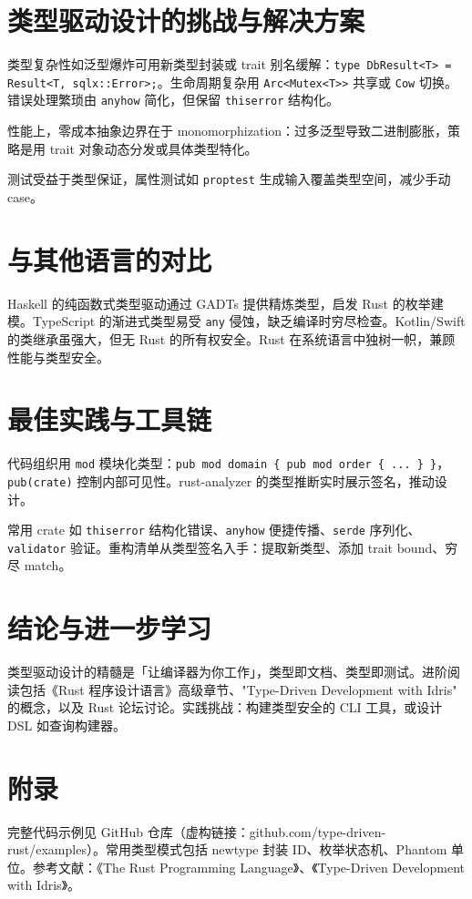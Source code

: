 \chapter{类型驱动设计的挑战与解决方案}
类型复杂性如泛型爆炸可用新类型封装或 trait 别名缓解：\texttt{type DbResult<T> = Result<T, sqlx::Error>;}。生命周期复杂用 \texttt{Arc<Mutex<T>>} 共享或 \texttt{Cow} 切换。错误处理繁琐由 \texttt{anyhow} 简化，但保留 \texttt{thiserror} 结构化。\par
性能上，零成本抽象边界在于 monomorphization：过多泛型导致二进制膨胀，策略是用 trait 对象动态分发或具体类型特化。\par
测试受益于类型保证，属性测试如 \texttt{proptest} 生成输入覆盖类型空间，减少手动 case。\par
\chapter{与其他语言的对比}
Haskell 的纯函数式类型驱动通过 GADTs 提供精炼类型，启发 Rust 的枚举建模。TypeScript 的渐进式类型易受 \texttt{any} 侵蚀，缺乏编译时穷尽检查。Kotlin/Swift 的类继承虽强大，但无 Rust 的所有权安全。Rust 在系统语言中独树一帜，兼顾性能与类型安全。\par
\chapter{最佳实践与工具链}
代码组织用 \texttt{mod} 模块化类型：\texttt{pub mod domain \{{} pub mod order \{{} ... \}{} \}{}}，\texttt{pub(crate)} 控制内部可见性。rust-analyzer 的类型推断实时展示签名，推动设计。\par
常用 crate 如 \texttt{thiserror} 结构化错误、\texttt{anyhow} 便捷传播、\texttt{serde} 序列化、\texttt{validator} 验证。重构清单从类型签名入手：提取新类型、添加 trait bound、穷尽 match。\par
\chapter{结论与进一步学习}
类型驱动设计的精髓是「让编译器为你工作」，类型即文档、类型即测试。进阶阅读包括《Rust 程序设计语言》高级章节、"Type-Driven Development with Idris" 的概念，以及 Rust 论坛讨论。实践挑战：构建类型安全的 CLI 工具，或设计 DSL 如查询构建器。\par
\chapter{附录}
完整代码示例见 GitHub 仓库（虚构链接：github.com/type-driven-rust/examples）。常用类型模式包括 newtype 封装 ID、枚举状态机、Phantom 单位。参考文献：《The Rust Programming Language》、《Type-Driven Development with Idris》。\par
